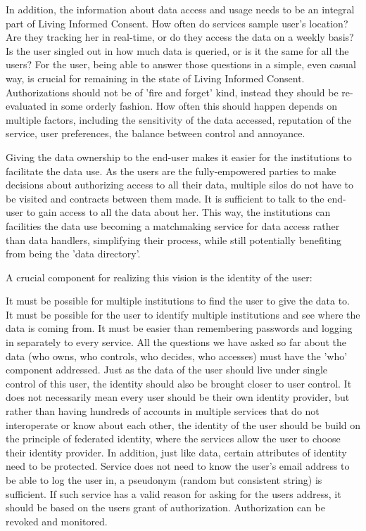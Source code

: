 In addition, the information about data access and usage needs to be an integral part of Living Informed Consent.
How often do services sample user's location?
Are they tracking her in real-time, or do they access the data on a weekly basis?
Is the user singled out in how much data is queried, or is it the same for all the users?
For the user, being able to answer those questions in a simple, even casual way, is crucial for remaining in the state of Living Informed Consent.
Authorizations should not be of 'fire and forget' kind, instead they should be re-evaluated in some orderly fashion.
How often this should happen depends on multiple factors, including the sensitivity of the data accessed, reputation of the service, user preferences, the balance between control and annoyance.

Giving the data ownership to the end-user makes it easier for the institutions to facilitate the data use.
As the users are the fully-empowered parties to make decisions about authorizing access to all their data, multiple silos do not have to be visited and contracts between them made.
It is sufficient to talk to the end-user to gain access to all the data about her.
This way, the institutions can facilities the data use becoming a matchmaking service for data access rather than data handlers, simplifying their process, while still potentially benefiting from being the 'data directory'.

A crucial component for realizing this vision is the identity of the user:

It must be possible for multiple institutions to find the user to give the data to.
It must be possible for the user to identify multiple institutions and see where the data is coming from.
It must be easier than remembering passwords and logging in separately to every service.
All the questions we have asked so far about the data (who owns, who controls, who decides, who accesses) must have the 'who' component addressed.
Just as the data of the user should live under single control of this user, the identity should also be brought closer to user control.
It does not necessarily mean every user should be their own identity provider, but rather than having hundreds of accounts in multiple services that do not interoperate or know about each other, the identity of the user should be build on the principle of federated identity, where the services allow the user to choose their identity provider.
In addition, just like data, certain attributes of identity need to be protected.
Service does not need to know the user's email address to be able to log the user in, a pseudonym (random but consistent string) is sufficient.
If such service has a valid reason for asking for the users address, it should be based on the users grant of authorization.
Authorization can be revoked and monitored.


